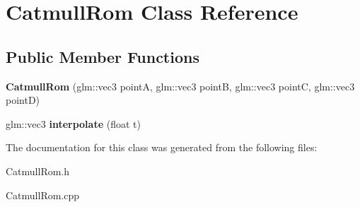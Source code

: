 \hypertarget{class_catmull_rom}{}\section{Catmull\+Rom Class Reference}
\label{class_catmull_rom}
\subsection*{Public Member Functions}
\begin{DoxyCompactItemize}
\item 
\hypertarget{class_catmull_rom_a7c2ba84389cd456dd74cfc817fd6ae46}{}{\bfseries Catmull\+Rom} (glm\+::vec3 point\+A, glm\+::vec3 point\+B, glm\+::vec3 point\+C, glm\+::vec3 point\+D)\label{class_catmull_rom_a7c2ba84389cd456dd74cfc817fd6ae46}

\item 
\hypertarget{class_catmull_rom_af77bf819993de8e541d3a7db5825faae}{}glm\+::vec3 {\bfseries interpolate} (float t)\label{class_catmull_rom_af77bf819993de8e541d3a7db5825faae}

\end{DoxyCompactItemize}


The documentation for this class was generated from the following files\+:\begin{DoxyCompactItemize}
\item 
Catmull\+Rom.\+h\item 
Catmull\+Rom.\+cpp\end{DoxyCompactItemize}
